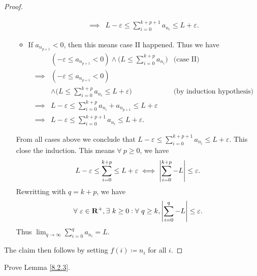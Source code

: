 \begin{proof}
\begin{itemize}
\begin{itemize}
\begin{align*}
                            \implies & L - \varepsilon \leq \sum_{i = 0}^{k + p + 1} a_{n_i} \leq L + \varepsilon.
                        \end{align*}
                  \item If \(a_{n_{p + 1}} < 0\), then this means case II happened.
                        Thus we have
                        \begin{align*}
                                     & (-\varepsilon \leq a_{n_{p + 1}} < 0) \land \Bigg(L \leq \sum_{i = 0}^{k + p} a_{n_i}\Bigg) & \text{(case II)}                 \\
                            \implies & (-\varepsilon \leq a_{n_{p + 1}} < 0)                                                                                          \\
                                     & \land \Bigg(L \leq \sum_{i = 0}^{k + p} a_{n_i} \leq L + \varepsilon\Bigg)                  & \text{(by induction hypothesis)} \\
                            \implies & L - \varepsilon \leq \sum_{i = 0}^{k + p} a_{n_i} + a_{n_{p + 1}} \leq L + \varepsilon                                         \\
                            \implies & L - \varepsilon \leq \sum_{i = 0}^{k + p + 1} a_{n_i} \leq L + \varepsilon.
                        \end{align*}
              \end{itemize}
              From all cases above we conclude that \(L - \varepsilon \leq \sum_{i = 0}^{k + p + 1} a_{n_i} \leq L + \varepsilon\).
              This close the induction.
              This means \(\forall\ p \geq 0\), we have
              \[
                  L - \varepsilon \leq \sum_{i = 0}^{k + p} \leq L + \varepsilon \iff \abs*{\sum_{i = 0}^{k + p} - L} \leq \varepsilon.
              \]
              Rewritting with \(q = k + p\), we have
              \[
                  \forall\ \varepsilon \in \mathbf{R}^+, \exists\ k \geq 0 : \forall\ q \geq k, \abs*{\sum_{i = 0}^q - L} \leq \varepsilon.
              \]
              Thus \(\lim_{q \to \infty} \sum_{i = 0}^q a_{n_i} = L\).
    \end{itemize}
    The claim then follows by setting \(f(i) \coloneqq n_i\) for all \(i\).
\end{proof}

\exercisesection

\begin{exercise}\label{ex 8.2.1}
    Prove Lemma \ref{8.2.3}.
\end{exercise}

